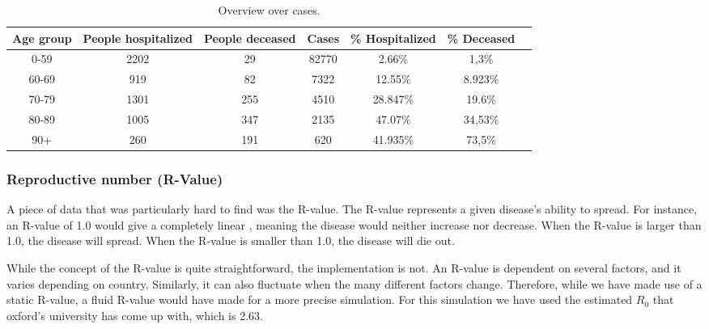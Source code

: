 \begin{table}[H]
	\centering
	\begin{tabular}{ccccccc}	%
		\toprule
		Age group & People hospitalized & People deceased & Cases & \% Hospitalized & \% Deceased \\\midrule
		0-59 & 2202 & 29 & 82770 & 2.66\% & 1,3\%           \\
		60-69 & 919 & 82  & 7322 & 12.55\% & 8.923\%           \\
		70-79 & 1301 & 255 & 4510 & 28.847\% & 19.6\%           \\
		80-89 & 1005 & 347 & 2135 & 47.07\%  & 34,53\%         \\
		90+ & 260 & 191 & 620 & 41.935\% & 73,5\%         \\
		\bottomrule
	\end{tabular}
	\caption{Overview over cases.}
	\label{tab:cases}
\end{table}


\subsubsection{Reproductive number (R-Value)}
A piece of data that was particularly hard to find was the R-value. The R-value represents a given disease's ability to spread. For instance, an R-value of 1.0 would give a completely linear , meaning the disease would neither increase nor decrease. When the R-value is larger than 1.0, the disease will spread. When the R-value is smaller than 1.0, the disease will die out.

While the concept of the R-value is quite straightforward, the implementation is not. An R-value is dependent on several factors, and it varies depending on country. Similarly, it can also fluctuate when the many different factors change. Therefore, while we have made use of a static R-value, a fluid R-value would have made for a more precise simulation. For this simulation we have used the estimated $R_0$ that oxford's university has come up with, which is 2.63.
 \citep{mahase_covid-19_2020}

